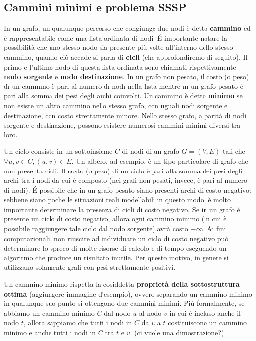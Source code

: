 \documentclass[a4paper]{article}
\begin{document}
	\subsection{Cammini minimi e problema SSSP}
	In un grafo, un qualunque percorso che congiunge due nodi è detto \textbf{cammino} ed è rappresentabile come una lista ordinata di nodi. \'E importante notare la possibilità che uno stesso nodo sia presente più volte all'interno dello stesso cammino, quando ciò accade si parla di \textbf{cicli} (che approfondiremo di seguito). Il primo e l'ultimo nodo di questa lista ordinata sono chiamati rispettivamente \textbf{nodo sorgente} e \textbf{nodo destinazione}. In un grafo non pesato, il costo (o peso) di un cammino è pari al numero di nodi nella lista mentre in un grafo pesato è pari alla somma dei pesi degli archi coinvolti. Un cammino è detto \textbf{minimo} se non esiste un altro cammino nello stesso grafo, con uguali nodi sorgente e destinazione, con costo strettamente minore. Nello stesso grafo, a parità di nodi sorgente e destinazione, possono esistere numerosi cammini minimi diversi tra loro.
	
	Un ciclo consiste in un sottoinsieme $C$ di nodi di un grafo $G=(V,E)$ tali che $\forall u,v \in C, (u,v) \in E$. Un albero, ad esempio, è un tipo particolare di grafo che non presenta cicli. Il costo (o peso) di un ciclo è pari alla somma dei pesi degli archi tra i nodi da cui è composto (nei grafi non pesati, invece, è pari al numero di nodi). \'E possibile che in un grafo pesato siano presenti archi di costo negativo: sebbene siano poche le situazioni reali modellabili in questo modo, è molto importante determinare la presenza di cicli di costo negativo. Se in un grafo è presente un ciclo di costo negativo, allora ogni cammino minimo (in cui è possibile raggiungere tale ciclo dal nodo sorgente) avrà costo $-\infty$. Ai fini computazionali, non riuscire ad individuare un ciclo di costo negativo può determinare lo spreco di molte risorse di calcolo e di tempo eseguendo un algoritmo che produce un risultato inutile. Per questo motivo, in genere si utilizzano solamente grafi con pesi strettamente positivi.
	
	Un cammino minimo rispetta la cosiddetta \textbf{proprietà della sottostruttura ottima} (aggiungere immagine d'esempio), ovvero separando un cammino minimo in qualunque suo punto si ottengono due cammini minimi. Più formalmente, se abbiamo un cammino minimo $C$ dal nodo $u$ al nodo $v$ in cui è incluso anche il nodo $t$, allora sappiamo che tutti i nodi in $C$ da $u$ a $t$ costituiscono un cammino minimo e anche tutti i nodi in $C$ tra $t$ e $v$. (ci vuole una dimostrazione?)
	
\end{document}
